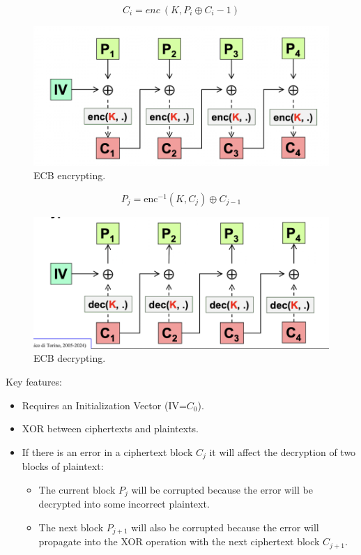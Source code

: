 \begin{multicols}{2}
    \begin{equation*}
        \boxed{C_i = enc \ (K, P_i \oplus C_i-1)}
    \end{equation*}
    \begin{figure}[H]
        \includegraphics[width=\linewidth]{Images/Cryptography/CBCEncrypt.png}
        \caption{ECB encrypting.}
    \end{figure}
    \columnbreak
    \begin{equation*}
        \boxed{P_j = \text{enc}^{-1}(K, C_j) \oplus C_{j-1}}
    \end{equation*}
    \begin{figure}[H]
        \includegraphics[width=\linewidth]{Images/Cryptography/CBCDecrypt.png}
        \caption{ECB decrypting.}
    \end{figure}
\end{multicols}

Key features:
\begin{itemize}
    \item Requires an Initialization Vector (IV=$C_0$).
    \item XOR between ciphertexts and plaintexts.
    \item If there is an error in a ciphertext block $C_j$ it will affect the decryption of two blocks of plaintext:
    \begin{itemize}
        \item The current block $P_j$ will be corrupted because the error will be decrypted into some incorrect plaintext. 
        \item The next block  $P_{j+1}$  will also be corrupted because the error will propagate into the XOR operation with the next ciphertext block  $C_{j+1}$.
    \end{itemize} 
\end{itemize}

